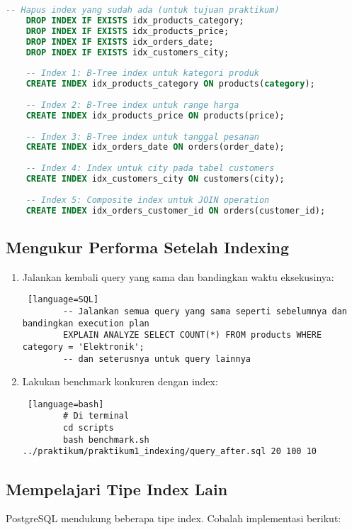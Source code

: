 \begin{lstlisting}[language=SQL]
	-- Hapus index yang sudah ada (untuk tujuan praktikum)
	DROP INDEX IF EXISTS idx_products_category;
	DROP INDEX IF EXISTS idx_products_price;
	DROP INDEX IF EXISTS idx_orders_date;
	DROP INDEX IF EXISTS idx_customers_city;
	
	-- Index 1: B-Tree index untuk kategori produk
	CREATE INDEX idx_products_category ON products(category);
	
	-- Index 2: B-Tree index untuk range harga
	CREATE INDEX idx_products_price ON products(price);
	
	-- Index 3: B-Tree index untuk tanggal pesanan
	CREATE INDEX idx_orders_date ON orders(order_date);
	
	-- Index 4: Index untuk city pada tabel customers
	CREATE INDEX idx_customers_city ON customers(city);
	
	-- Index 5: Composite index untuk JOIN operation
	CREATE INDEX idx_orders_customer_id ON orders(customer_id);
\end{lstlisting}

\subsection{Mengukur Performa Setelah Indexing}
\begin{enumerate}
	\item Jalankan kembali query yang sama dan bandingkan waktu eksekusinya:
	
	\begin{lstlisting} [language=SQL]
		-- Jalankan semua query yang sama seperti sebelumnya dan bandingkan execution plan
		EXPLAIN ANALYZE SELECT COUNT(*) FROM products WHERE category = 'Elektronik';
		-- dan seterusnya untuk query lainnya
	\end{lstlisting}
	
	\item Lakukan benchmark konkuren dengan index:
	
	\begin{lstlisting} [language=bash]
		# Di terminal
		cd scripts
		bash benchmark.sh ../praktikum/praktikum1_indexing/query_after.sql 20 100 10
	\end{lstlisting}
\end{enumerate}

\subsection{Mempelajari Tipe Index Lain}
PostgreSQL mendukung beberapa tipe index. Cobalah implementasi berikut:

